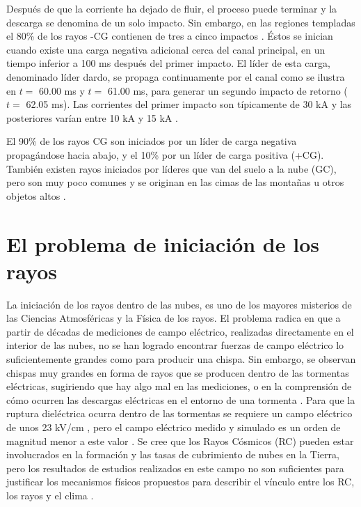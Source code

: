 \documentclass[11pt,oneside,openany,letter]{book}
\begin{document}
Después de que la corriente ha dejado de fluir, el proceso puede terminar y la descarga se denomina de un solo impacto. Sin embargo, en las regiones templadas el 80\% de los rayos -CG contienen de tres a cinco impactos \cite{DwyerUman2014}. \'Estos se inician cuando existe una carga negativa adicional cerca del canal principal, en un tiempo inferior a 100 ms despu\'es del primer impacto. El l\'ider de esta carga, denominado líder dardo, se propaga continuamente por el canal como se ilustra en $t=$ 60.00 ms y $t=$ 61.00 ms, para generar un segundo impacto de retorno ($t=$ 62.05 ms). Las corrientes del primer impacto son típicamente de 30 kA y las posteriores varían entre 10 kA y 15 kA \cite{DwyerUman2014}.

El 90\% de los rayos CG son iniciados por un l\'ider de carga negativa propagándose hacia abajo, y el 10\% por un l\'ider de carga positiva (+CG). También existen rayos iniciados por líderes que van del suelo a la nube (GC), pero son muy poco comunes y se originan en las cimas de las montañas u otros objetos altos \cite{DwyerUman2014}.


\section{El problema de iniciación de los rayos}
La iniciación de los rayos dentro de las nubes, es uno de los mayores misterios de las Ciencias Atmosféricas y la Física de los rayos. El problema radica en que a partir de décadas de mediciones de campo eléctrico, realizadas directamente en el interior de las nubes, no se han logrado encontrar fuerzas de campo eléctrico lo suficientemente grandes como para producir una chispa. Sin embargo, se observan chispas muy grandes en forma de rayos que se producen dentro de las tormentas eléctricas, sugiriendo que hay algo mal en las mediciones, o en la comprensión de cómo ocurren las descargas eléctricas en el entorno de una tormenta \cite{DwyerUman2014}. Para que la ruptura dieléctrica ocurra dentro de las tormentas se requiere un campo eléctrico de unos 23 kV/cm \cite{GurevichEtal2009}, pero el campo eléctrico medido y simulado es un orden de magnitud menor a este valor \cite{MarshallEtal2005, DwyerEtal2006, StolzenburgEtal2007}. Se cree que los Rayos Cósmicos (RC) pueden estar involucrados en la formación y las tasas de cubrimiento de nubes en la Tierra, pero los resultados de estudios realizados en este campo no son suficientes para justificar los mecanismos físicos propuestos para describir el vínculo entre los RC, los rayos y el clima \cite{KumarEtal2018}.
\end{document}

